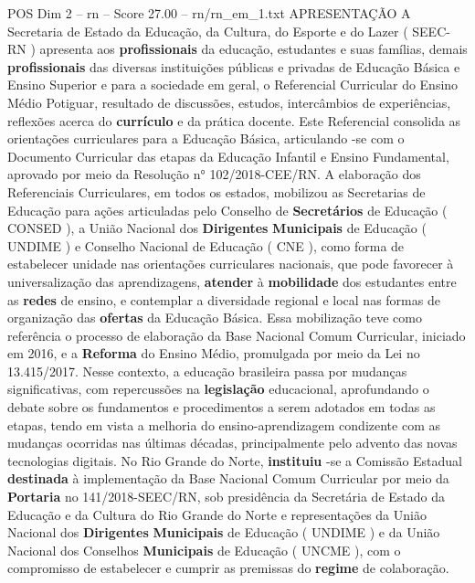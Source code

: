 \begin{textsample}{POS Dim 2 – rn – Score 27.00 – rn/rn\_em\_1.txt}  \label{ex:f2_pos_243}
APRESENTAÇÃO A Secretaria de Estado da Educação, da Cultura, do Esporte e do Lazer ( SEEC-RN ) apresenta aos \textbf{profissionais} da educação, estudantes e suas famílias, demais \textbf{profissionais} das diversas instituições públicas e privadas de Educação Básica e Ensino Superior e para a sociedade em geral, o Referencial Curricular do Ensino Médio Potiguar, resultado de discussões, estudos, intercâmbios de experiências, reflexões acerca do \textbf{currículo} e da prática docente.
Este Referencial consolida as orientações curriculares para a Educação Básica, articulando -se com o Documento Curricular das etapas da Educação Infantil e Ensino Fundamental, aprovado por meio da Resolução n{\EmojiFont °} 102/2018-CEE/RN.
A elaboração dos Referenciais Curriculares, em todos os estados, mobilizou as Secretarias de Educação para ações articuladas pelo Conselho de \textbf{Secretários} de Educação ( CONSED ), a União Nacional dos \textbf{Dirigentes} \textbf{Municipais} de Educação ( UNDIME ) e Conselho Nacional de Educação ( CNE ), como forma de estabelecer unidade nas orientações curriculares nacionais, que pode favorecer à universalização das aprendizagens, \textbf{atender} à \textbf{mobilidade} dos estudantes entre as \textbf{redes} de ensino, e contemplar a diversidade regional e local nas formas de organização das \textbf{ofertas} da Educação Básica.
Essa mobilização teve como referência o processo de elaboração da Base Nacional Comum Curricular, iniciado em 2016, e a \textbf{Reforma} do Ensino Médio, promulgada por meio da Lei no 13.415/2017.
Nesse contexto, a educação brasileira passa por mudanças significativas, com repercussões na \textbf{legislação} educacional, aprofundando o debate sobre os fundamentos e procedimentos a serem adotados em todas as etapas, tendo em vista a melhoria do ensino-aprendizagem condizente com as mudanças ocorridas nas últimas décadas, principalmente pelo advento das novas tecnologias digitais.
No Rio Grande do Norte, \textbf{instituiu} -se a Comissão Estadual \textbf{destinada} à implementação da Base Nacional Comum Curricular por meio da \textbf{Portaria} no 141/2018-SEEC/RN, sob presidência da Secretária de Estado da Educação e da Cultura do Rio Grande do Norte e representações da União Nacional dos \textbf{Dirigentes} \textbf{Municipais} de Educação ( UNDIME ) e da União Nacional dos Conselhos \textbf{Municipais} de Educação ( UNCME ), com o compromisso de estabelecer e cumprir as premissas do \textbf{regime} de colaboração.

\end{textsample}
